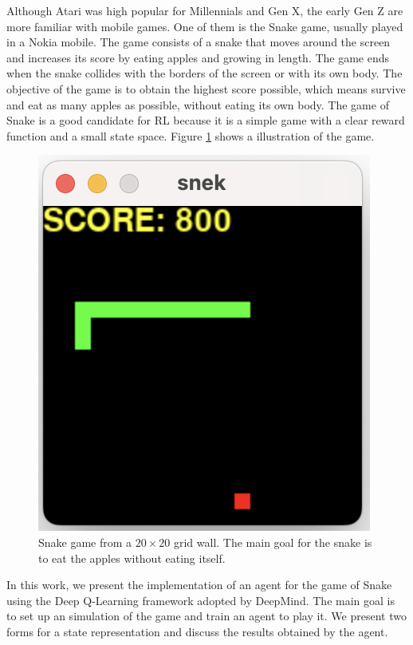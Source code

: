\documentclass[conference]{IEEEtran}
\begin{document}
Although Atari was high popular for Millennials and Gen X, the early Gen Z are more familiar with mobile games. One of them is the Snake game, usually played in a Nokia mobile. The game consists of a snake that moves around the screen and increases its score by eating apples and growing in length. The game ends when the snake collides with the borders of the screen or with its own body. The objective of the game is to obtain the highest score possible, which means survive and eat as many apples as possible, without eating its own body. The game of Snake is a good candidate for RL because it is a simple game with a clear reward function and a small state space. Figure \ref{snake-game} shows a illustration of the game.

\begin{figure}[thpb]
   \centering
   \includegraphics[scale=0.8]{snake-2.png}
   \caption{Snake game from a $20\times20$ grid wall. The main goal for the snake is to eat the apples without eating itself.}
   \label{snake-game}
\end{figure}

In this work, we present the implementation of an agent for the game of Snake using the Deep Q-Learning framework adopted by DeepMind. The main goal is to set up an simulation of the game and train an agent to play it. We present two forms for a state representation and discuss the results obtained by the agent.
\end{document}
